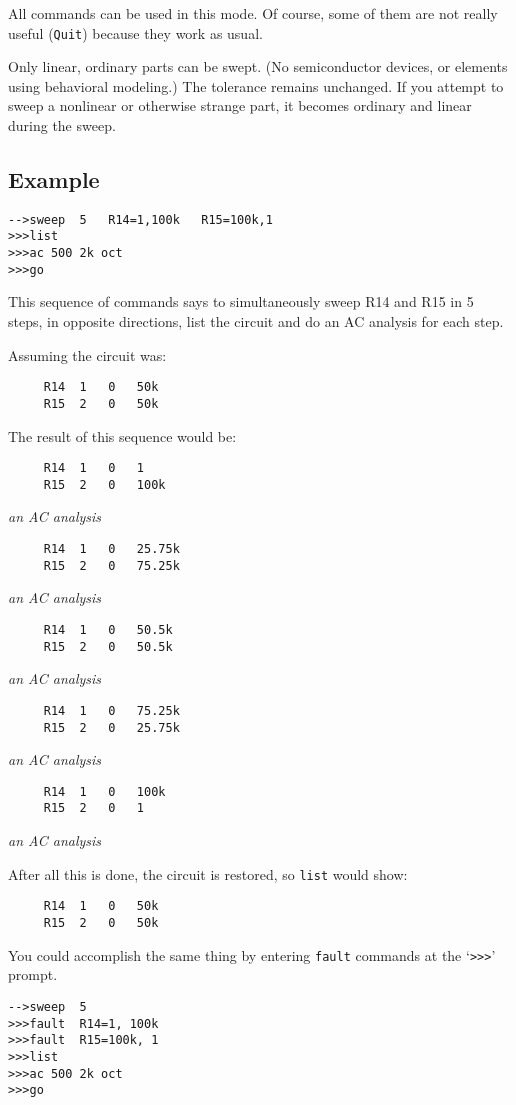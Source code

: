 All commands can be used in this mode.  Of course, some of them are not
really useful ({\tt Quit}) because they work as usual.

Only linear, ordinary parts can be swept.  (No semiconductor devices, or
elements using behavioral modeling.)  The tolerance remains unchanged.  If
you attempt to sweep a nonlinear or otherwise strange part, it becomes
ordinary and linear during the sweep.
\subsection{Example}

\begin{verbatim}
-->sweep  5   R14=1,100k   R15=100k,1
>>>list
>>>ac 500 2k oct
>>>go
\end{verbatim}

This sequence of commands says to simultaneously sweep R14 and R15 in 5 steps,
in opposite directions, list the circuit and do an AC analysis for each step.

Assuming the circuit was:
\begin{verbatim}
     R14  1   0   50k
     R15  2   0   50k
\end{verbatim}

The result of this sequence would be:
\begin{verbatim}
     R14  1   0   1
     R15  2   0   100k
\end{verbatim}
{\rm {\it an AC analysis}}
\begin{verbatim}
     R14  1   0   25.75k
     R15  2   0   75.25k
\end{verbatim}
{\rm {\it an AC analysis}}
\begin{verbatim}
     R14  1   0   50.5k
     R15  2   0   50.5k
\end{verbatim}
{\rm {\it an AC analysis}}
\begin{verbatim}
     R14  1   0   75.25k
     R15  2   0   25.75k
\end{verbatim}
{\rm {\it an AC analysis}}
\begin{verbatim}
     R14  1   0   100k
     R15  2   0   1
\end{verbatim}
{\rm {\it an AC analysis}}

After all this is done, the circuit is restored, so {\tt list} would show:
\begin{verbatim}
     R14  1   0   50k
     R15  2   0   50k
\end{verbatim}

You could accomplish the same thing by entering {\tt fault} commands at the
`{\tt >>>}' prompt.

\begin{verbatim}
-->sweep  5
>>>fault  R14=1, 100k
>>>fault  R15=100k, 1
>>>list
>>>ac 500 2k oct
>>>go
\end{verbatim}
